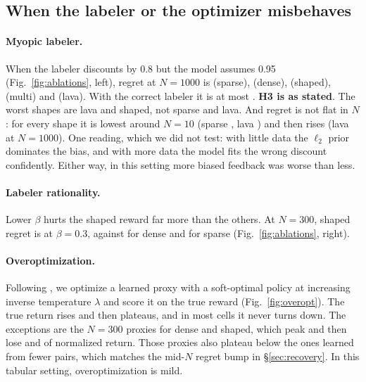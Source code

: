 \documentclass[10pt]{article}
\begin{document}
\subsection{When the labeler or the optimizer misbehaves}\label{sec:misspec}
\paragraph{Myopic labeler.} When the labeler discounts by 0.8 but the model assumes 0.95 (Fig.~\ref{fig:ablations}, left), regret at $N=1000$ is
\myopicsparse{} (sparse), \myopicdense{} (dense), \myopicshaped{} (shaped), \myopicmulti{} (multi) and \myopiclava{} (lava). With the
correct labeler it is at most \standardshaped. \textbf{H3 is \Hthree{} as stated}. The worst shapes are lava and shaped, not sparse
and lava. And regret is not flat in $N$: for every shape it is lowest around $N=10$ (sparse \regmyopicsparseten, lava \regmyopiclavaten)
and then rises (lava \regmyopiclavathousand{} at $N=1000$). One reading, which we did not test: with little data the $\ell_2$ prior dominates the bias, and with more data
the model fits the wrong discount confidently. Either way, in this setting more biased feedback was worse than less.

\paragraph{Labeler rationality.} Lower $\beta$ hurts the shaped reward far more than the others. At $N=300$, shaped regret is \regbetashapedthreehundredlow{}
at $\beta=0.3$, against \regbetadensethreehundredlow{} for dense and \regbetasparsethreehundredlow{} for sparse (Fig.~\ref{fig:ablations}, right).

\paragraph{Overoptimization.} Following \citet{gao2022scaling}, we optimize a learned proxy with a soft-optimal policy at increasing inverse
temperature $\lambda$ and score it on the true reward (Fig.~\ref{fig:overopt}). The true return rises and then plateaus, and in most cells it never turns down.
The exceptions are the $N=300$ proxies for dense and shaped, which peak and then lose \oodropdensec{} and \oodropshapedc{} of normalized return.
Those proxies also plateau below the ones learned from fewer pairs, which matches the mid-$N$ regret bump in \S\ref{sec:recovery}.
In this tabular setting, overoptimization is mild.
\end{document}
